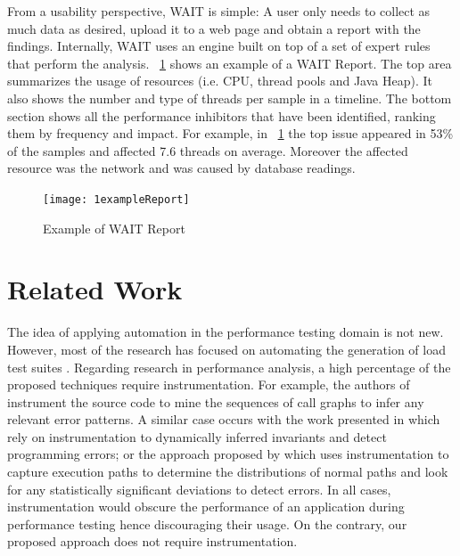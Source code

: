 \documentclass[runningheads,a4paper]{llncs}
\begin{document}
From a usability perspective, WAIT is simple: A user only needs to collect as
much data as desired, upload it to a web page and obtain a report with the
findings. Internally, WAIT uses an engine built on top of a set of expert rules
that perform the analysis. \figurename ~\ref{fig_WAITReport} shows an example of
a WAIT Report. The top area summarizes the usage of resources (i.e. CPU, thread
pools and Java Heap). It also shows the number and type of threads per sample in
a timeline. The bottom section shows all the performance inhibitors that have
been identified, ranking them by frequency and impact. For example, in
\figurename ~\ref{fig_WAITReport} the top issue appeared in 53\% of the samples
and affected 7.6 threads on average. Moreover the affected resource was the
network and was caused by database readings.

\begin{figure}[!h]
\texttt{[image: 1exampleReport]}
\caption{Example of WAIT Report}
\label{fig_WAITReport}
\end{figure}


\section{Related Work}

The idea of applying automation in the performance testing domain is not new.
However, most of the research has focused on automating the generation of load
test suites
\cite{Chen1,Elvira1,Zhang1,Briand1,Bayan1,Avritzer2,Avritzer3,Garousi1}.
Regarding research in performance analysis, a high percentage of the proposed
techniques require instrumentation. For example, the authors of \cite{Yang1}
instrument the source code to mine the sequences of call graphs to infer any
relevant error patterns. A similar case occurs with the work presented in
\cite{Hangal1,Csallner1} which rely on instrumentation to dynamically inferred
invariants and detect programming errors; or the approach proposed by
\cite{Chen2} which uses instrumentation to capture execution paths to determine the distributions of normal paths and look for any statistically
significant deviations to detect errors. In all cases, instrumentation would obscure the
performance of an application during performance testing hence discouraging their usage.
On the contrary, our proposed approach does not require instrumentation.
\end{document}
